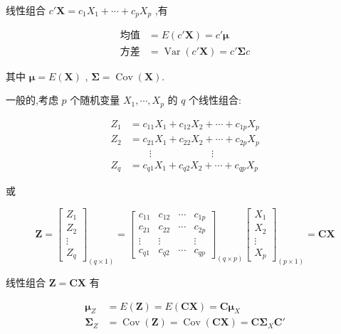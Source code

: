 
线性组合 $c'\bm{X} = c_1X_1 + \cdots + c_pX_p$ ,有

\label{eq:2-43}
\begin{equation}
\begin{aligned}
\text{均值} &= E(c'\bm{X}) = c'\bm{\mu} \\
\text{方差} &= \operatorname{Var}(c'\bm{X}) = c'\bm{\Sigma}c
\end{aligned} \tag{2-43}
\end{equation}

其中 $\bm{\mu} = E(\bm{X})$ , $\bm{\Sigma} = \operatorname{Cov}(\bm{X})$.

一般的,考虑 $p$ 个随机变量 $X_1, \cdots, X_p$ 的 $q$ 个线性组合:

\[
\begin{aligned}
Z_1 &= c_{11}X_1 + c_{12}X_2 + \cdots + c_{1p}X_p \\
Z_2 &= c_{21}X_1 + c_{22}X_2 + \cdots + c_{2p}X_p \\
&\qquad \vdots \qquad \qquad \qquad \vdots \\
Z_q &= c_{q1}X_1 + c_{q2}X_2 + \cdots + c_{qp}X_p
\end{aligned}
\]

或

\label{eq:2-44}
\begin{equation}
\bm{Z} =
\begin{bmatrix}
Z_1 \\ Z_2 \\ \vdots \\ Z_q
\end{bmatrix}_{(q \times 1)}
=
\begin{bmatrix}
c_{11} & c_{12} & \cdots & c_{1p} \\
c_{21} & c_{22} & \cdots & c_{2p} \\
\vdots & \vdots & & \vdots \\
c_{q1} & c_{q2} & \cdots & c_{qp}
\end{bmatrix}_{(q \times p)}
\begin{bmatrix}
X_1 \\ X_2 \\ \vdots \\ X_p
\end{bmatrix}_{(p \times 1)}
= \bm{C}\bm{X} \tag{2-44}
\end{equation}

线性组合 $\bm{Z} = \bm{C}\bm{X}$ 有

\label{eq:2-45}
\begin{equation}
\begin{aligned}
\bm{\mu}_Z &= E(\bm{Z}) = E(\bm{C}\bm{X}) = \bm{C}\bm{\mu}_X \\
\bm{\Sigma}_Z &= \operatorname{Cov}(\bm{Z}) = \operatorname{Cov}(\bm{C}\bm{X}) = \bm{C}\bm{\Sigma}_X\bm{C}'
\end{aligned} \tag{2-45}
\end{equation}

